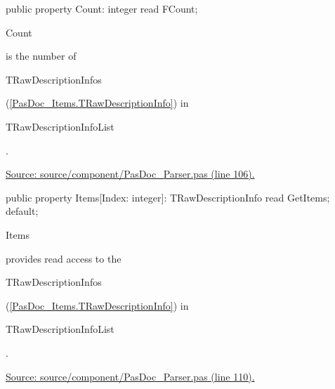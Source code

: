 \documentclass{report}
\newif\ifpdf
\begin{document}
\begin{list}{}{
\setlength{\itemindent}{0cm}
\setlength{\listparindent}{0cm}
\setlength{\leftmargin}{\evensidemargin}
\addtolength{\leftmargin}{\tmplength}
\settowidth{\labelsep}{X}
\addtolength{\leftmargin}{\labelsep}
\setlength{\labelwidth}{\tmplength}
}
\label{PasDoc_Parser.TRawDescriptionInfoList-Count}
\item[\textbf{Count}\hfill]
\ifpdf
\begin{flushleft}
\fi
\begin{ttfamily}
public property Count: integer read FCount;\end{ttfamily}

\ifpdf
\end{flushleft}
\fi


\par \begin{ttfamily}Count\end{ttfamily} is the number of \begin{ttfamily}TRawDescriptionInfos\end{ttfamily}(\ref{PasDoc_Items.TRawDescriptionInfo}) in \begin{ttfamily}TRawDescriptionInfoList\end{ttfamily}.\par
\href{https://github.com/pasdoc/pasdoc/blob/master/source/component/PasDoc_Parser.pas#L106}{Source: source/component/PasDoc{\_}Parser.pas (line 106).}\label{PasDoc_Parser.TRawDescriptionInfoList-Items}
\item[\textbf{Items}\hfill]
\ifpdf
\begin{flushleft}
\fi
\begin{ttfamily}
public property Items[Index: integer]: TRawDescriptionInfo read GetItems; default;\end{ttfamily}

\ifpdf
\end{flushleft}
\fi


\par \begin{ttfamily}Items\end{ttfamily} provides read access to the \begin{ttfamily}TRawDescriptionInfos\end{ttfamily}(\ref{PasDoc_Items.TRawDescriptionInfo}) in \begin{ttfamily}TRawDescriptionInfoList\end{ttfamily}.\par
\href{https://github.com/pasdoc/pasdoc/blob/master/source/component/PasDoc_Parser.pas#L110}{Source: source/component/PasDoc{\_}Parser.pas (line 110).}\end{list}
\end{document}

